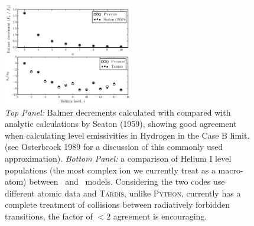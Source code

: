 \documentclass[preprint, a4paper, 11pt]{aastex}
\begin{document}
\begin{figure}
\centering
\includegraphics[width=0.5\textwidth]{figures/fig_caseb_tardis.eps}
\caption{
{\sl Top Panel:} Balmer decrements calculated with \py compared with analytic calculations
by Seaton (1959), showing good agreement when calculating level emissivities in Hydrogen
in the Case B limit.
(see Osterbrock 1989 for a discussion of this commonly used approximation).
{\sl Bottom Panel:}  a comparison of Helium I level populations (the most complex ion we currently 
treat as a macro-atom) between \py~and \tar~models. Considering the 
two codes use different atomic data and \textsc{Tardis,} unlike \textsc{Python,} currently has 
a complete treatment of collisions between radiatively forbidden transitions, the factor of 
$<2$ agreement is encouraging. 
}
\label{tests}
\end{figure}
\nocite{osterbrock}
\nocite{seaton1959}





%





%
%
\end{document}
